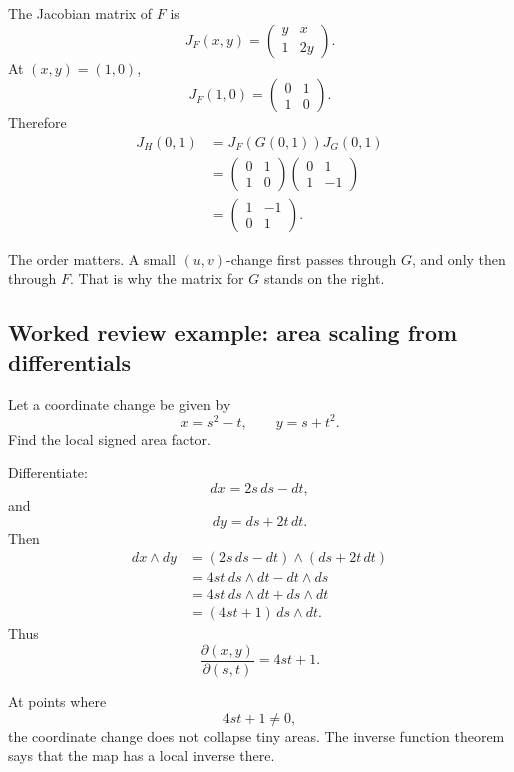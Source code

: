 The Jacobian matrix of \(F\) is
\[
    J_F(x,y)=
    \begin{pmatrix}
        y & x\\
        1 & 2y
    \end{pmatrix}.
\]
At \((x,y)=(1,0)\),
\[
    J_F(1,0)=
    \begin{pmatrix}
        0 & 1\\
        1 & 0
    \end{pmatrix}.
\]
Therefore
\[
\begin{aligned}
    J_H(0,1)
    &=
    J_F(G(0,1))J_G(0,1)\\
    &=
    \begin{pmatrix}
        0 & 1\\
        1 & 0
    \end{pmatrix}
    \begin{pmatrix}
        0 & 1\\
        1 & -1
    \end{pmatrix}\\
    &=
    \begin{pmatrix}
        1 & -1\\
        0 & 1
    \end{pmatrix}.
\end{aligned}
\]

The order matters.  A small \((u,v)\)-change first passes through \(G\), and only then
through \(F\).  That is why the matrix for \(G\) stands on the right.

\subsection{Worked review example: area scaling from differentials}

Let a coordinate change be given by
\[
    x=s^2-t,
    \qquad
    y=s+t^2.
\]
Find the local signed area factor.

Differentiate:
\[
    dx=2s\,ds-dt,
\]
and
\[
    dy=ds+2t\,dt.
\]
Then
\[
\begin{aligned}
dx\wedge dy
&=
(2s\,ds-dt)\wedge(ds+2t\,dt)\\
&=
4st\,ds\wedge dt-dt\wedge ds\\
&=
4st\,ds\wedge dt+ds\wedge dt\\
&=
(4st+1)\,ds\wedge dt.
\end{aligned}
\]
Thus
\[
\boxed{
    \frac{\partial(x,y)}{\partial(s,t)}=4st+1.
}
\]

At points where
\[
    4st+1\ne0,
\]
the coordinate change does not collapse tiny areas.  The inverse function theorem says
that the map has a local inverse there.

